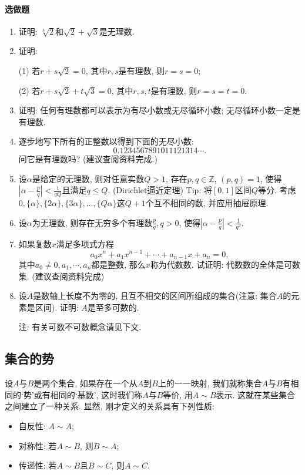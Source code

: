 \documentclass[UTF8,11pt, a4paper, oneside, fontset=none]{ctexbook}
\begin{document}
\paragraph{选做题}
\begin{enumerate}


\item 证明: $\sqrt[3]{2}$和$\sqrt 2 + \sqrt 3$是无理数.
 
\item 证明: 

(1) 若$r + s \sqrt 2 =0$, 其中$r, s$是有理数, 则$r = s = 0$;

(2) 若$r + s \sqrt 2 + t \sqrt 3=0$, 其中$r, s, t$是有理数, 则$r = s= t=0$.

\item 证明: 任何有理数都可以表示为有尽小数或无尽循环小数; 无尽循环小数一定是有理数.
 
\item 逐步地写下所有的正整数以得到下面的无尽小数:
\[
0.1234567891011121314\cdots.
\]
问它是有理数吗? (建议查阅资料完成.)

\item 设$\alpha$是给定的无理数, 则对任意实数$Q>1$, 存在$p, q \in \mathbb Z$, $(p, q)=1$, 使得$|\alpha-\frac{p}{q}| < \frac{1}{qQ}$且满足$q \leq Q$. (Dirichlet逼近定理) Tip: 将$[0, 1]$区间$Q$等分. 考虑$0, \{ \alpha\}, \{ 2\alpha\}, \{ 3\alpha\}, \ldots, \{ Q\alpha\}$这$Q+1$个互不相同的数, 并应用抽屉原理.


\item 设$\alpha$为无理数, 则存在无穷多个有理数$\frac{p}{q}, q>0$, 使得$|\alpha - \frac{p}{q}| < \frac{1}{q^2}$. 


\item 如果复数$x$满足多项式方程
\[
a_0 x^n + a_1 x^{n-1} + \cdots + a_{n-1} x + a_n =0,
\]
其中$a_0 \neq 0, a_1, \cdots, a_n$都是整数, 那么$x$称为代数数. 试证明: 代数数的全体是可数集. (建议查阅资料完成)

\item 设$A$是数轴上长度不为零的, 且互不相交的区间所组成的集合(注意: 集合$A$的元素是区间). 证明: $A$是至多可数的.


注: 有关可数不可数概念请见下文.


\end{enumerate}

\subsection{集合的势}


设$A$与$B$是两个集合, 如果存在一个从$A$到$B$上的一一映射, 我们就称集合$A$与$B$有相同的`势'或有相同的`基数', 这时我们称$A$与$B$等价, 用$A \sim B$表示. 这就在某些集合之间建立了一种关系. 显然, 刚才定义的关系具有下列性质:
\begin{itemize}
\item{自反性:} $A \sim A$;
\item{对称性:} 若$A \sim B$, 则$B \sim A$;
\item{传递性:} 若$A \sim B$且$B \sim C$, 则$A \sim C$.
\end{itemize}
\end{document}
